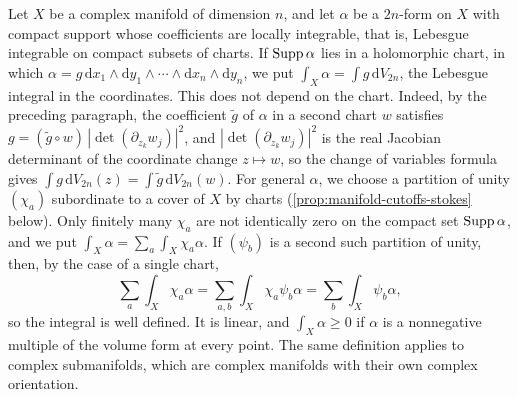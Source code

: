 Let $X$ be a complex manifold of dimension $n$, and let $\alpha$ be a $2n$-form on $X$ with compact support whose coefficients are locally integrable, that is, Lebesgue integrable on compact subsets of charts. If $\operatorname{Supp}\alpha$ lies in a holomorphic chart, in which $\alpha=g\,\mathrm dx_1\wedge\mathrm dy_1\wedge\cdots\wedge\mathrm dx_n\wedge\mathrm dy_n$, we put $\int_X\alpha=\int g\,\mathrm dV_{2n}$, the Lebesgue integral in the coordinates. This does not depend on the chart. Indeed, by the preceding paragraph, the coefficient $\tilde g$ of $\alpha$ in a second chart $w$ satisfies $g=(\tilde g\circ w)\,|\det(\partial_{z_k}w_j)|^2$, and $|\det(\partial_{z_k}w_j)|^2$ is the real Jacobian determinant of the coordinate change $z\mapsto w$, so the change of variables formula gives $\int g\,\mathrm dV_{2n}(z)=\int\tilde g\,\mathrm dV_{2n}(w)$. For general $\alpha$, we choose a partition of unity $(\chi_a)$ subordinate to a cover of $X$ by charts (\cref{prop:manifold-cutoffs-stokes} below). Only finitely many $\chi_a$ are not identically zero on the compact set $\operatorname{Supp}\alpha$, and we put $\int_X\alpha=\sum_a\int_X\chi_a\alpha$. If $(\psi_b)$ is a second such partition of unity, then, by the case of a single chart,
\[
 \sum_a\int_X\chi_a\alpha=\sum_{a,b}\int_X\chi_a\psi_b\alpha=\sum_b\int_X\psi_b\alpha,
\]
so the integral is well defined. It is linear, and $\int_X\alpha\geq0$ if $\alpha$ is a nonnegative multiple of the volume form at every point. The same definition applies to complex submanifolds, which are complex manifolds with their own complex orientation.

